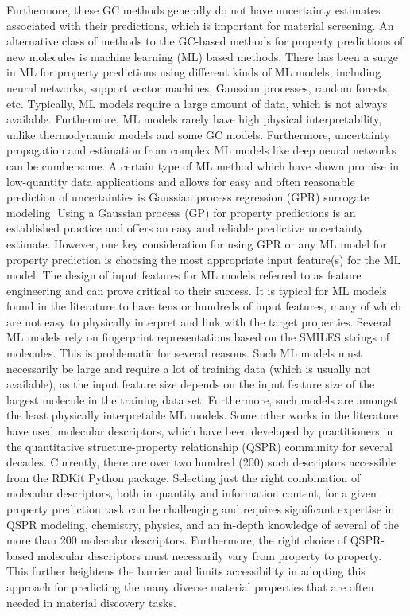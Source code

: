 \documentclass[journal=jacsat,manuscript=article]{achemso}
\begin{document}
Furthermore, these GC methods generally do not have uncertainty estimates associated with their predictions, which is important for material screening.
 An alternative class of methods to the GC-based methods for property predictions of new molecules is machine learning (ML) based methods. 
 There has been a surge in ML for property predictions using different kinds of ML models, including neural networks, support vector machines, Gaussian processes, random forests, etc. Typically, ML models require a large amount of data, which is not always available. 
 Furthermore, ML models rarely have high physical interpretability, unlike thermodynamic models and some GC models. 
 Furthermore, uncertainty propagation and estimation from complex ML models like deep neural networks can be cumbersome. 
 A certain type of ML method which have shown promise in low-quantity data applications and allows for easy and often reasonable prediction of uncertainties is Gaussian process regression (GPR) surrogate modeling. 
 Using a Gaussian process (GP) for property predictions is an established practice and offers an easy and reliable predictive uncertainty estimate. However, one key consideration for using GPR or any ML model for property prediction is choosing the most appropriate input feature(s) for the ML model. The design of input features for ML models referred to as feature engineering and can prove critical to their success. It is typical for ML models found in the literature to have tens or hundreds of input features, many of which are not easy to physically interpret and link with the target properties. Several ML models rely on fingerprint representations based on the SMILES strings of molecules. This is problematic for several reasons. Such ML models must necessarily be large and require a lot of training data (which is usually not available), as the input feature size depends on the input feature size of the largest molecule in the training data set. Furthermore, such models are amongst the least physically interpretable ML models. 
 Some other works in the literature have used molecular descriptors, which have been developed by practitioners in the quantitative structure-property relationship (QSPR) community for several decades. Currently, there are over two hundred (200) such descriptors accessible from the RDKit Python package. Selecting just the right combination of molecular descriptors, both in quantity and information content, for a given property prediction task can be challenging and requires significant expertise in QSPR modeling, chemistry, physics, and an in-depth knowledge of several of the more than 200 molecular descriptors. Furthermore, the right choice of QSPR-based molecular descriptors must necessarily vary from property to property. This further heightens the barrier and limits accessibility in adopting this approach for predicting the many diverse material properties that are often needed in material discovery tasks.
\end{document}
